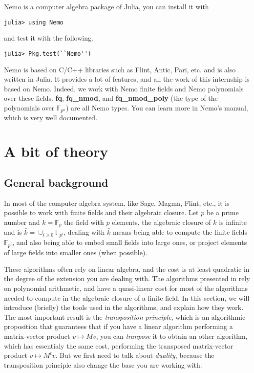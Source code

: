 \documentclass[a4paper,11pt]{article}
\theoremstyle{break}
\theoremstyle{definition}
\theoremstyle{remark}
\begin{document}
Nemo is a computer algebra package of Julia, you can install it with 
\begin{verbatim}
julia> using Nemo
\end{verbatim}
and test it with the following.
\begin{verbatim}
julia> Pkg.test(``Nemo'')
\end{verbatim}
Nemo is based on C/C++ libraries such as Flint, Antic, Pari, etc. and is also
written in Julia. It provides a lot of features, and all the work of this
internship is based on Nemo. Indeed, we work with Nemo finite fields and Nemo
polynomials over these fields. \textbf{fq}, \textbf{fq\_nmod}, and
\textbf{fq\_nmod\_poly} (the type of the polynomials over $\mathbb{F}_{p^n}$) 
are
all Nemo types. You can learn more in Nemo's manual, which is very well
documented.

\section{A bit of theory}
\subsection{General background}
In most of the computer algebra system, like Sage, Magma, Flint, etc., it is 
possible to work with finite
fields and their algebraic closure. Let $p$ be a prime number and
$k=\mathbb{F}_p$ the field with $p$ elements, the algebraic closure of $k$ is
infinite and is $\bar k = \cup_{i\geq 0} \mathbb{F}_{p^i}$, dealing with $\bar
k$ means being able to compute the finite fields $\mathbb{F}_{p^i}$, and also
being able to embed small fields into large ones, or project elements of large
fields into smaller ones (when possible).

These algorithms often rely on linear algebra, and the cost is at least 
quadratic in
the degree of the extension you are dealing with. The algorithms presented in
\cite{DDS14} rely on polynomial arithmetic, and have a quasi-linear cost for 
most of the algorithms needed to
compute in the algebraic closure of a finite field. In this section, we will
introduce (briefly) the tools used in the algorithms, and explain how they work.
The most important result is the \emph{transposition principle}, which is an
algorithmic proposition that guarantees that if you have a linear algorithm
performing a matrix-vector product $v\mapsto Mv$, you can \emph{tranpose} it to
obtain an other algorithm, which has essentialy the same cost, performing the 
transposed matrix-vector product $v\mapsto
M^tv$. But we first need to talk about \emph{duality}, because the transposition
principle also change the base you are working with.
\end{document}
